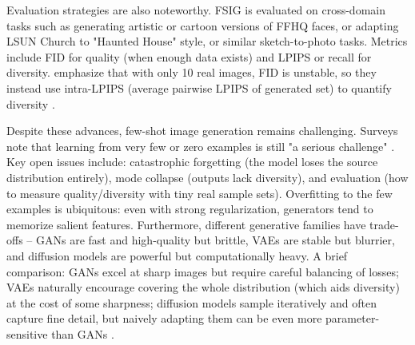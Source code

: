 Evaluation strategies are also noteworthy. 
FSIG is evaluated on cross-domain tasks such as generating artistic or cartoon versions of FFHQ faces, 
or adapting LSUN Church to "Haunted House" style, or similar sketch-to-photo tasks. Metrics include FID 
for quality (when enough data exists) and LPIPS or recall for diversity. \cite{zhao2023closerlookfewshotimage} emphasize that with only 10 real 
images, FID is unstable, so they instead use intra-LPIPS (average pairwise LPIPS of generated set) to quantify diversity .

Despite these advances, few-shot image generation remains challenging. Surveys note that learning from very few or zero examples is still "a serious challenge" \cite{song2022comprehensivesurveyfewshotlearning}.
Key open issues include: catastrophic forgetting (the model loses the source distribution entirely), 
mode collapse (outputs lack diversity), and evaluation (how to measure quality/diversity with tiny real sample sets). 
Overfitting to the few examples is ubiquitous: even with strong regularization, generators tend to memorize salient features. 
Furthermore, different generative families have trade-offs -- GANs are fast and high-quality but brittle, VAEs are stable but blurrier, 
and diffusion models are powerful but computationally heavy. A brief comparison: GANs excel at sharp images but require careful balancing of 
losses; VAEs naturally encourage covering the whole distribution (which aids diversity) at the cost of some sharpness; 
diffusion models sample iteratively and often capture fine detail, but naively adapting them can be even more parameter-sensitive than GANs \cite{cao2024fewshotimagegenerationconditional}.




